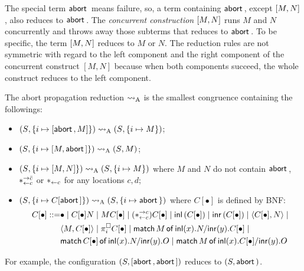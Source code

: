 The special term $\mathsf{abort\,}$ means failure, so, a term containing $\mathsf{abort\,}$,
except $[{M,N}]$, also reduces to $\mathsf{abort\,}$.  The \textit{concurrent
construction} $[{M,N}]$ runs $M$
and $N$ concurrently and throws
away those subterms that reduces to $\mathsf{abort\,}$.
To be specific, the term $[{M,N}]$ reduces to ${M}$
or ${N}$.
The reduction rules are not symmetric with regard to the left component
and the right component of the concurrent construct $[M,N]$ because
when both components succeed, the whole construct reduces to
the left component.
\begin{definition}
 The abort propagation reduction $\rightsquigarrow_{\mathrm A}$ is the smallest
 congruence containing the
 followings:
\begin{itemize}
 \item  $({S}{},{\{i\mapsto {[{\mathsf{abort\,}, M}]}\}})\rightsquigarrow_{\mathrm A}
 ({S}{},{\{i\mapsto {M}\}})$;
 \item
   $({S}{},{\{i\mapsto {[{M,\mathsf{abort\,}}]}\}})\rightsquigarrow_{\mathrm A}
 ({S}{},{{M}})$;
 \item $({S}{},{\{i\mapsto {[{M,N}]}\}})\rightsquigarrow_{\mathrm A} ({S}{},{\{i\mapsto {M}\}})$ where
       $M$ and $N$ do not contain $\mathsf{abort\,}$, $\ast^{\rightarrow {\bar{c}}}_{\leftarrow{c}}$ or $\ast_{\leftarrow{c}}$
       for any locations $c,d$;
 \item  $({S}{},{\{i\mapsto {C[\mathsf{abort\,}]}\}})\rightsquigarrow_{\mathrm A}
 ({S}{},{\{i\mapsto {\mathsf{abort\,}}\}})$  where $C[\bullet]$ is defined by BNF:
\begin{align*}
  C[\bullet] ::= &\bullet \mid
C[\bullet] N \mid
{M C[\bullet]}\mid
(\ast^{\rightarrow {c}}_{\leftarrow{c}})C[\bullet]\mid
\mathsf{inl}\left({C[\bullet]}\right)\mid
\mathsf{inr}\left({C[\bullet]}\right)\mid
\langle{C[\bullet], N}\rangle\mid \\&
\langle{M, C[\bullet]}\rangle\mid
\pi^\square_i{C[\bullet]}\mid
\mathsf{match}\,{M}\,\mathsf{of}\, \mathsf{inl}({x}). {N}/ \mathsf{inr}({y}). {C[\bullet]}\mid\\ &
\mathsf{match}\,{C[\bullet]}\,\mathsf{of}\, \mathsf{inl}({x}). {N}/ \mathsf{inr}({y}). {O}\mid
\mathsf{match}\,{M}\,\mathsf{of}\, \mathsf{inl}({x}). {C[\bullet]}/ \mathsf{inr}({y}). {O}
\end{align*}
\end{itemize}
\end{definition}
For example, the configuration $(S, [{\mathsf{abort\,},\mathsf{abort\,}}])$ reduces to $(S,
\mathsf{abort\,})$.

